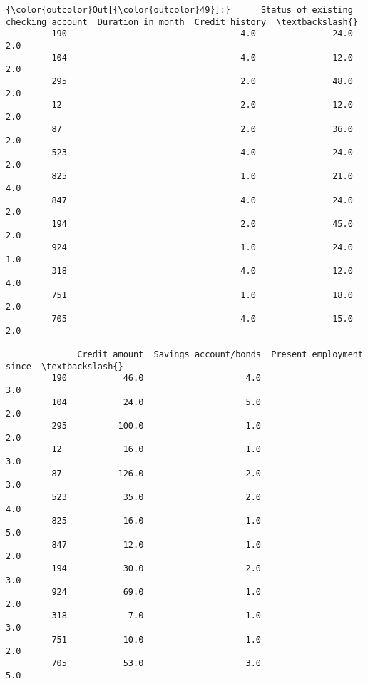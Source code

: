 \documentclass[11pt]{article}
\begin{document}
            \begin{Verbatim}[commandchars=\\\{\}]
{\color{outcolor}Out[{\color{outcolor}49}]:}      Status of existing checking account  Duration in month  Credit history  \textbackslash{}
         190                                  4.0               24.0             2.0   
         104                                  4.0               12.0             2.0   
         295                                  2.0               48.0             2.0   
         12                                   2.0               12.0             2.0   
         87                                   2.0               36.0             2.0   
         523                                  4.0               24.0             2.0   
         825                                  1.0               21.0             4.0   
         847                                  4.0               24.0             2.0   
         194                                  2.0               45.0             2.0   
         924                                  1.0               24.0             1.0   
         318                                  4.0               12.0             4.0   
         751                                  1.0               18.0             2.0   
         705                                  4.0               15.0             2.0   
         
              Credit amount  Savings account/bonds  Present employment since  \textbackslash{}
         190           46.0                    4.0                       3.0   
         104           24.0                    5.0                       2.0   
         295          100.0                    1.0                       2.0   
         12            16.0                    1.0                       3.0   
         87           126.0                    2.0                       3.0   
         523           35.0                    2.0                       4.0   
         825           16.0                    1.0                       5.0   
         847           12.0                    1.0                       2.0   
         194           30.0                    2.0                       3.0   
         924           69.0                    1.0                       2.0   
         318            7.0                    1.0                       3.0   
         751           10.0                    1.0                       2.0   
         705           53.0                    3.0                       5.0   
         

\end{Verbatim}
\end{document}
